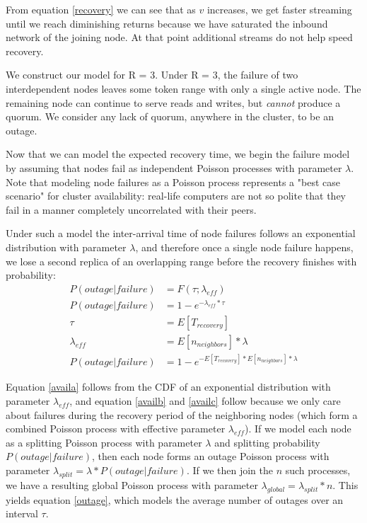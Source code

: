 \documentclass{article}
\begin{document}
From equation \ref{recovery} we can see that as $v$ increases, we get faster streaming until we reach diminishing returns because we have saturated the inbound network of the joining node. At that point additional streams do not help speed recovery.

We construct our model for R = 3. Under R = 3, the failure of two interdependent nodes leaves some token range with only a single active node. The remaining node can continue to serve reads and writes, but \emph{cannot} produce a quorum. We consider any lack of quorum, anywhere in the cluster, to be an outage.

Now that we can model the expected recovery time, we begin the failure model by assuming that nodes fail as independent Poisson processes with parameter $\lambda$. Note that modeling node failures as a Poisson process represents a "best case scenario" for cluster availability: real-life computers are not so polite that they fail in a manner completely uncorrelated with their peers.

Under such a model the inter-arrival time of node failures follows an exponential distribution with parameter $\lambda$, and therefore once a single node failure happens, we lose a second replica of an overlapping range before the recovery finishes with probability:
\begin{subequations} \label{avail}
\begin{align}
        P(outage|failure) & = F(\tau; \lambda_{eff}) \\ \label{availa}
        P(outage|failure) & = 1 - e^{-\lambda_{eff} * \tau} \\ \label{availb}
        \tau & = E[T_{recovery}] \\ \label{availc}
        \lambda_{eff} & = E[n_{neighbors}] * \lambda \\ \label{availd}
        P(outage|failure) & = 1 - e^{- E[T_{recovery}] * E[n_{neighbors}] * \lambda}
\end{align}
\end{subequations}

Equation \ref{availa} follows from the CDF of an exponential distribution with parameter $\lambda_{eff}$, and equation \ref{availb} and \ref{availc} follow because we only care about failures during the recovery period of the neighboring nodes (which form a combined Poisson process with effective parameter $\lambda_{eff}$). If we model each node as a splitting Poisson process with parameter $\lambda$ and splitting probability $P(outage|failure)$, then each node forms an outage Poisson process with parameter $\lambda_{split} = \lambda * P(outage|failure)$. If we then join the $n$ such processes, we have a resulting global Poisson process with parameter $\lambda_{global} = \lambda_{split} * n$. This yields equation \ref{outage}, which models the average number of outages over an interval $\tau$.
\end{document}
